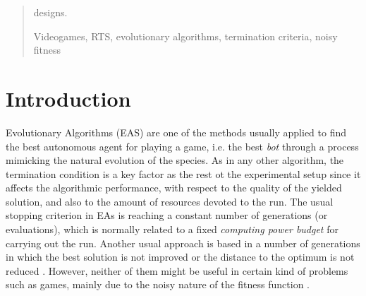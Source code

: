 \documentclass[runningheads,a4paper]{llncs}
\newcommand{\keywords}[1]{\par\addvspace\baselineskip
\noindent\keywordname\enspace\ignorespaces#1}
\begin{document}
\begin{abstract}
designs.
\keywords{Videogames, RTS, evolutionary algorithms, termination criteria, noisy fitness}
\end{abstract}

%
%
\section{Introduction}


Evolutionary Algorithms (EAS) are one of the methods usually applied to find the
 best autonomous agent for playing a game, i.e. the best \textit{bot} \cite{Agent_Smith_CEC2009,bots:evostar,unreal:gecco10:anon,DBLP:conf/cig/Fernandez-AresGMG12:anon} through a process mimicking the natural evolution of the 
species. As in any other algorithm, the termination condition is a key factor 
as the rest ot the experimental setup since it affects the algorithmic 
performance, with respect to the quality of the yielded solution, and also to 
the amount of resources devoted to the run. The usual stopping criterion in EAs 
\cite{EAs_Back96} is reaching a constant number of generations (or 
evaluations), 
 which is normally related to a fixed {\em computing power budget} for carrying out 
the run. Another usual approach is based in a number of generations in which 
the best solution is not improved or the distance to the optimum is not reduced 
\cite{RocheTermination13}. However, neither of them might be useful in certain 
kind of problems such as games, mainly due to the noisy nature of the fitness 
function \cite{merelo14:noisy,bots:evostar}.
\end{document}
